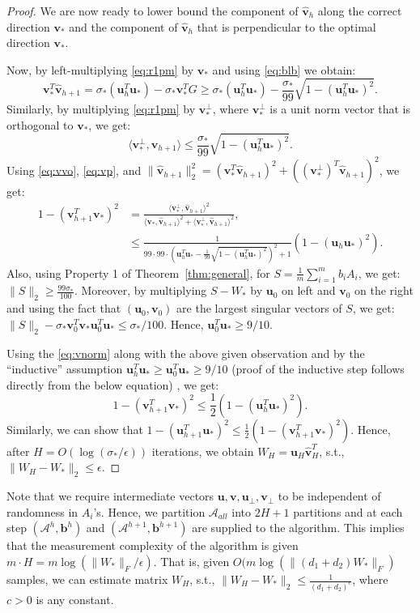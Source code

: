 \documentclass[11pt]{article}
\newcommand{\tp}[1]{{#1}^{T}}
\newcommand{\calA}{\mathcal{A}}
\renewcommand{\u}{\bm{u}}
\renewcommand{\v}{\bm{v}}
\newcommand{\vhn}{\widehat{\v}_{h+1}}
\newcommand{\so}{\sigma_*}
\newcommand{\ut}{\u_h}
\newcommand{\utt}{\tp{\u}_{h}}
\newcommand{\utnt}{\tp{\u}_{h+1}}
\newcommand{\vtnt}{\tp{\v}_{h+1}}
\newcommand{\uo}{\u_* }
\newcommand{\vo}{\v_* }
\newcommand{\vot}{\tp{\v}_* }
\newcommand{\ip}[2]{\langle #1, #2 \rangle}
\newcommand{\Wo}{W_*}
\renewcommand{\b}{\bm{b}}
\begin{document}
\begin{proof}
We are now ready to lower bound the component of $\widehat{\v}_h$ along the correct direction $\vo$ and the component of $\widehat{\v}_h$ that is perpendicular to the optimal direction $\vo$. 

Now, by left-multiplying \eqref{eq:r1pm}  by $\vo$ and using \eqref{eq:blb} we obtain: 
\begin{equation}
  \label{eq:vvo}
  \vot\vhn=\so(\utt\uo)-\so\vot G\geq \so(\utt\uo)-\frac{\so}{99}\sqrt{1-(\utt\uo)^2}. 
\end{equation}
Similarly, by multiplying \eqref{eq:r1pm} by $\vo^\perp$, where $\vo^\perp$ is a unit norm vector that is orthogonal to $\vo$, we get: 
\begin{equation}
  \label{eq:vp}
  \ip{\vo^\perp}{\vhn}\leq \frac{\so}{99}\sqrt{1-(\utt\uo)^2}. 
\end{equation}
Using \eqref{eq:vvo}, \eqref{eq:vp}, and $\|\vhn\|_2^2=(\vot\vhn)^2+((\vo^\perp)^T\vhn)^2$, we get: 
\begin{align}
  1-(\vtnt\vo)^2 &= \frac{\ip{\vo^\perp}{\vhn}^2}{\ip{\vo}{\vhn}^2+\ip{\vo^\perp}{\vhn}^2},\nonumber\\
&\leq \frac{1}{99\cdot 99\cdot (\utt\uo-\frac{1}{99}\sqrt{1-(\utt\uo)^2})^2+1} (1-(\ut\uo)^2).
  \label{eq:vnorm}
\end{align}
Also, using Property 1 of Theorem~\ref{thm:general}, for $S=\frac{1}{m}\sum_{i=1}^m b_i A_i$, we get: $\|S\|_2\geq \frac{99\so}{100}$. Moreover, by multiplying $S-\Wo$ by $\u_0$ on left and $\v_0$ on the right and using the fact that $(\u_0, \v_0)$ are the largest singular vectors of $S$, we get: $\|S\|_2-\so\v_0^T\vo \u_0^T\uo\leq \so/100$. Hence, $\u_0^T\uo\geq 9/10$. 

Using the \eqref{eq:vnorm} along with the above given observation and by the ``inductive'' assumption $\u_h^T\uo\geq \u_0^T\uo\geq 9/10$ (proof of the inductive step follows directly from the below equation) , we get: 
\begin{equation}
  \label{eq:dist}
  1-(\vtnt\vo)^2 \leq \frac{1}{2}  (1-(\utt\uo)^2). 
\end{equation}
Similarly, we can show that $ 1-(\utnt\uo)^2 \leq \frac{1}{2}  (1-(\vtnt\vo)^2).$ Hence, after $H=O(\log(\so/\epsilon))$ iterations, we obtain $W_H=\u_H \widehat{\v}^T_H$, s.t., $\|W_H-\Wo\|_2\leq \epsilon$. 
\end{proof}
Note that we require intermediate vectors $\u, \v, \u_\perp, \v_\perp$ to be independent of randomness in $A_i$'s. Hence, we partition $\calA_{all}$ into $2H+1$ partitions and at each step $(\calA^h, \b^h)$ and $(\calA^{h+1}, \b^{h+1})$ are supplied to the algorithm. This implies that the measurement complexity of the algorithm is given $m\cdot H=m\log(\|\Wo\|_F/\epsilon)$. That is, given $O(m \log(\|(d_1+d_2)\Wo\|_F)$ samples, we can estimate matrix $W_H$, s.t., $\|W_H-\Wo\|_2 \leq \frac{1}{(d_1+d_2)^c}$, where $c>0$ is any  constant. 
\end{document}
